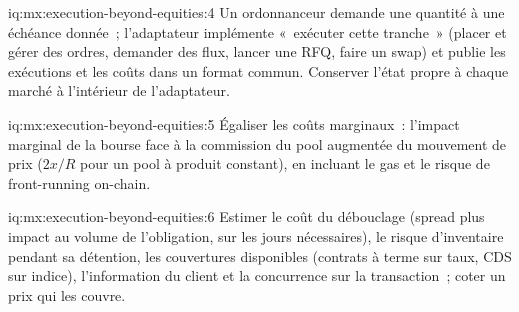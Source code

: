 \begin{solution}{iq:mx:execution-beyond-equities:4}
Un ordonnanceur demande une quantité à une échéance donnée~; l'adaptateur implémente «~exécuter cette tranche~» (placer et gérer des ordres, demander des flux, lancer une RFQ, faire un swap) et
publie les exécutions et les coûts dans un format commun. Conserver l'état propre à chaque marché à l'intérieur de l'adaptateur.
\end{solution}

\begin{solution}{iq:mx:execution-beyond-equities:5}
Égaliser les coûts marginaux~: l'impact marginal de la bourse face à la commission du pool augmentée du mouvement de prix ($2x/R$ pour un pool à produit constant), en incluant le gas et
le risque de front-running on-chain.
\end{solution}

\begin{solution}{iq:mx:execution-beyond-equities:6}
Estimer le coût du débouclage (spread plus impact au volume de l'obligation, sur les jours nécessaires), le risque d'inventaire pendant sa détention, les couvertures
disponibles (contrats à terme sur taux, CDS sur indice), l'information du client et la concurrence sur la transaction~; coter un prix qui les couvre.
\end{solution}
